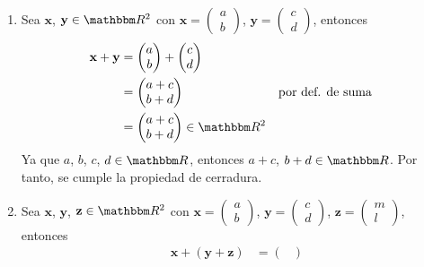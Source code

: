 \begin{examplebox}{}{}
\begin{enumerate}[label=\roman*), topsep=6pt, itemsep=0pt]
        \item Sea $\mathbf{x}$, $\mathbf{y} \in \RR[2]$ con $\mathbf{x} = \begin{pmatrix}
            a \\
            b
        \end{pmatrix}$, $\displaystyle \mathbf{y} = \begin{pmatrix}
            c \\
            d
        \end{pmatrix}$, entonces
        \begin{align*}
            \mathbf{x} + \mathbf{y} & = \begin{pmatrix}
                a \\
                b
            \end{pmatrix} + \begin{pmatrix}
                c \\
                d
            \end{pmatrix} \\
            & = \begin{pmatrix}
                a + c \\
                b + d
            \end{pmatrix} && \text{por def. de suma} \\
            & = \begin{pmatrix}
                a + c \\
                b + d
            \end{pmatrix} \in \RR[2]
        \end{align*}
        Ya que $a$, $b$, $c$, $d \in \RR$, entonces $a+c$, $b+d \in \RR$. Por tanto, se cumple la propiedad de cerradura.
        \item Sea $\mathbf{x}$, $\mathbf{y}$, $\mathbf{z} \in \RR[2]$ con $\mathbf{x} = \begin{pmatrix}
            a \\
            b
        \end{pmatrix}$, $\mathbf{y} = \begin{pmatrix}
            c \\
            d
        \end{pmatrix}$, $\mathbf{z} = \begin{pmatrix}
            m \\
            l
        \end{pmatrix}$, entonces
        \begin{align*}
            \mathbf{x} + (\mathbf{y} + \mathbf{z}) & = \begin{pmatrix}

\end{pmatrix}
\end{align*}
\end{enumerate}
\end{examplebox}
